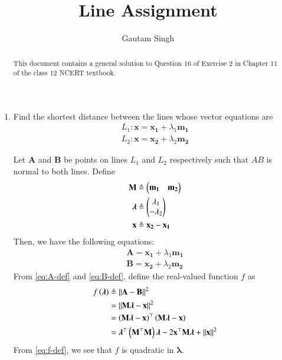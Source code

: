\documentclass[journal,12pt,twocolumn]{IEEEtran}
\renewcommand{\vec}[1]{\boldsymbol{\mathbf{#1}}}
\begin{document}
\vspace{3cm}
\title{Line Assignment}
\author{Gautam Singh}
\maketitle
\bigskip

\begin{abstract}
    This document contains a general solution to Question 16 of 
    Exercise 2 in Chapter 11 of the class 12 NCERT textbook.
\end{abstract}

\begin{enumerate}
    \item Find the shortest distance between the lines whose vector equations are
    \begin{align}
        L_1: \vec{x} = \vec{x_1} + \lambda_1\vec{m_1} \label{eq:L1} \\
        L_2: \vec{x} = \vec{x_2} + \lambda_2\vec{m_2} \label{eq:L2}
    \end{align}

    \solution Let $\vec{A}$ and $\vec{B}$ be points on lines $L_1$ and $L_2$
    respectively such that $AB$ is normal to both lines. Define
    \begin{align}
        \vec{M} &\triangleq \myvec{\vec{m_1} & \vec{m_2}} \label{eq:M-def} \\
        \vec{\lambda} &\triangleq \myvec{\lambda_1\\-\lambda_2} \label{eq:lambda-def} \\
        \vec{x} &\triangleq \vec{x_2} - \vec{x_1} \label{eq:x-def}
    \end{align}
    Then, we have the following equations:
    \begin{align}
        \vec{A} = \vec{x_1} + \lambda_1\vec{m_1} \label{eq:A-def} \\
        \vec{B} = \vec{x_2} + \lambda_2\vec{m_2} \label{eq:B-def}
    \end{align}
    From \eqref{eq:A-def} and \eqref{eq:B-def}, define the real-valued function
    $f$ as
    \begin{align}
        f\brak{\vec{\lambda}} &\triangleq \norm{\vec{A}-\vec{B}}^2 \\
                              &= \norm{\vec{M}\vec{\lambda}-\vec{x}}^2 \\
                              &= \brak{\vec{M\lambda}-\vec{x}}^\top\brak{\vec{M\lambda}-\vec{x}} \\
                              &= \vec{\lambda}^\top\brak{\vec{M}^\top\vec{M}}\vec{\lambda} - 2\vec{x}^\top\vec{M\lambda} + \norm{\vec{x}}^2
        \label{eq:f-def}
    \end{align}
    From \eqref{eq:f-def}, we see that $f$ is quadratic in $\vec{\lambda}$.


\end{enumerate}
\end{document}
